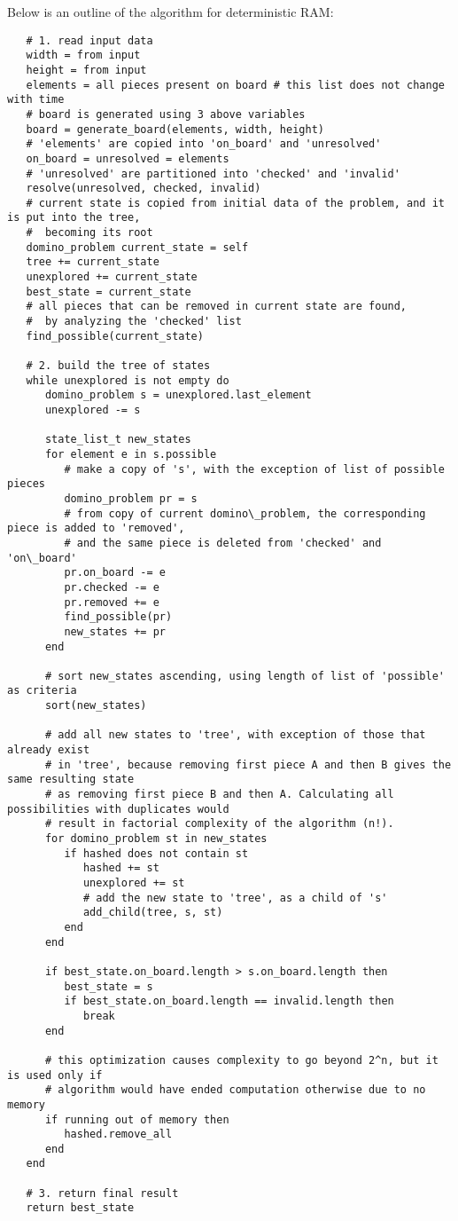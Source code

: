 Below is an outline of the algorithm for deterministic RAM:

\begin{verbatim}
   # 1. read input data
   width = from input
   height = from input
   elements = all pieces present on board # this list does not change with time
   # board is generated using 3 above variables
   board = generate_board(elements, width, height) 
   # 'elements' are copied into 'on_board' and 'unresolved'
   on_board = unresolved = elements
   # 'unresolved' are partitioned into 'checked' and 'invalid'
   resolve(unresolved, checked, invalid)
   # current state is copied from initial data of the problem, and it is put into the tree,
   #  becoming its root
   domino_problem current_state = self
   tree += current_state
   unexplored += current_state
   best_state = current_state
   # all pieces that can be removed in current state are found,
   #  by analyzing the 'checked' list
   find_possible(current_state)
   
   # 2. build the tree of states
   while unexplored is not empty do
      domino_problem s = unexplored.last_element
      unexplored -= s
      
      state_list_t new_states
      for element e in s.possible
         # make a copy of 's', with the exception of list of possible pieces
         domino_problem pr = s 
         # from copy of current domino\_problem, the corresponding piece is added to 'removed',
         # and the same piece is deleted from 'checked' and 'on\_board'
         pr.on_board -= e
         pr.checked -= e
         pr.removed += e
         find_possible(pr)
         new_states += pr
      end
       
      # sort new_states ascending, using length of list of 'possible' as criteria
      sort(new_states)
      
      # add all new states to 'tree', with exception of those that already exist
      # in 'tree', because removing first piece A and then B gives the same resulting state 
      # as removing first piece B and then A. Calculating all possibilities with duplicates would
      # result in factorial complexity of the algorithm (n!).
      for domino_problem st in new_states
         if hashed does not contain st
            hashed += st
            unexplored += st
            # add the new state to 'tree', as a child of 's'
            add_child(tree, s, st)
         end
      end
      
      if best_state.on_board.length > s.on_board.length then
         best_state = s
         if best_state.on_board.length == invalid.length then
            break
      end
   
      # this optimization causes complexity to go beyond 2^n, but it is used only if
      # algorithm would have ended computation otherwise due to no memory
      if running out of memory then
         hashed.remove_all
      end
   end
   
   # 3. return final result
   return best_state
\end{verbatim}

